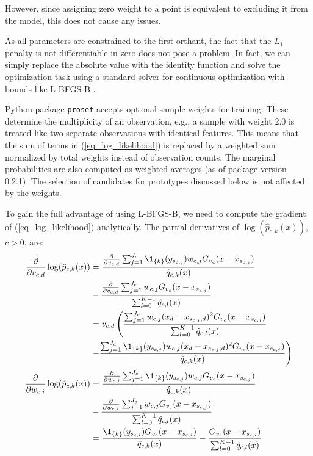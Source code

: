 However, since assigning zero weight to a point is equivalent to excluding it from the model, this does not cause any issues.\par
%
As all parameters are constrained to the first orthant, the fact that the $L_1$ penalty is not differentiable in zero does not pose a problem.
In fact, we can simply replace the absolute value with the identity function and solve the optimization task using a standard solver for continuous optimization with bounds like L-BFGS-B \cite{Byrd_95}.
%
\begin{remark}
Python package \texttt{proset} accepts optional sample weights for training.
These determine the multiplicity of an observation, e.g., a sample with weight 2.0 is treated like two separate observations with identical features.
This means that the sum of terms in (\ref{eq_log_likelihood}) is replaced by a weighted sum normalized by total weights instead of observation counts.
The marginal probabilities are also computed as weighted averages (as of package version 0.2.1).
The selection of candidates for prototypes discussed below is not affected by the weights.
\end{remark}
%
To gain the full advantage of using L-BFGS-B, we need to compute the gradient of (\ref{eq_log_likelihood}) analytically.
The partial derivatives of $\log(\hat{p}_{c,k}(x))$, $c>0$, are:
%
\begin{align}
\frac{\partial}{\partial v_{c,d}}\log(\hat{p}_{c,k}(x))&
=\frac{\frac{\partial}{\partial v_{c,d}}
\sum_{j=1}^{J_c}\1_{\{k\}}(y_{s_{c,j}})w_{c,j}G_{v_c}(x-x_{s_{c,j}})}
{\hat{q}_{c,k}(x)}
\label{eq_p_partial_v}\\
&-\frac{\frac{\partial}{\partial v_{c,d}}
\sum_{j=1}^{J_c}w_{c,j}G_{v_c}(x-x_{s_{c,j}})}
{\sum_{l=0}^{K-1}\hat{q}_{c,l}(x)}\notag\\
&=v_{c,d}\left(\frac{\sum_{j=1}^{J_c}w_{c,j}
(x_d-x_{s_{c,j},d})^2G_{v_c}(x-x_{s_{c,j}})}
{\sum_{l=0}^{K-1}\hat{q}_{c,l}(x)}\right.\notag\\
&\left.-\frac{\sum_{j=1}^{J_c}\1_{\{k\}}(y_{s_{c,j}})w_{c,j}
(x_d-x_{s_{c,j},d})^2G_{v_c}(x-x_{s_{c,j}})}
{\hat{q}_{c,k}(x)}\right)\notag\\
\frac{\partial}{\partial w_{c,i}}\log(\hat{p}_{c,k}(x))&
=\frac{\frac{\partial}{\partial w_{c,i}}
\sum_{j=1}^{J_c}\1_{\{k\}}(y_{s_{c,j}})w_{c,j}G_{v_c}(x-x_{s_{c,j}})}
{\hat{q}_{c,k}(x)}
\label{eq_p_partial_w}\\
&-\frac{\frac{\partial}{\partial w_{c,i}}
\sum_{j=1}^{J_c}w_{c,j}G_{v_c}(x-x_{s_{c,j}})}
{\sum_{l=0}^{K-1}\hat{q}_{c,l}(x)}\notag\\
&=\frac{\1_{\{k\}}(y_{s_{c,i}})G_{v_c}(x-x_{s_{c,i}})}
{\hat{q}_{c,k}(x)}
-\frac{G_{v_c}(x-x_{s_{c,i}})}
{\sum_{l=0}^{K-1}\hat{q}_{c,l}(x)}\notag
\end{align}
